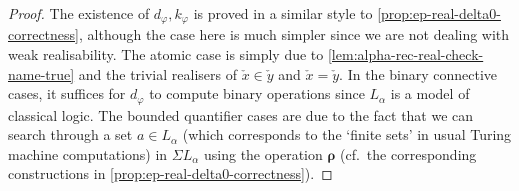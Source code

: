 \documentclass[12pt,openany]{book}
\theoremstyle{plain}
\theoremstyle{definition}
\begin{document}
\begin{proof}
  The existence of $d_\varphi, k_\varphi$ is proved in a similar style to \autoref{prop:ep-real-delta0-correctness}, although the case here is much simpler since we are not dealing with weak realisability. The atomic case is simply due to \autoref{lem:alpha-rec-real-check-name-true} and the trivial realisers of $\check{x} \in \check{y}$ and $\check{x} = \check{y}$. In the binary connective cases, it suffices for $d_\varphi$ to compute binary operations since $L_\alpha$ is a model of classical logic. The bounded quantifier cases are due to the fact that we can search through a set $a \in L_\alpha$ (which corresponds to the `finite sets' in usual Turing machine computations) in $\Sigma L_\alpha$ using the operation $\bm{\rho}$ (cf.\ the corresponding constructions in \autoref{prop:ep-real-delta0-correctness}).


\end{proof}
\end{document}
